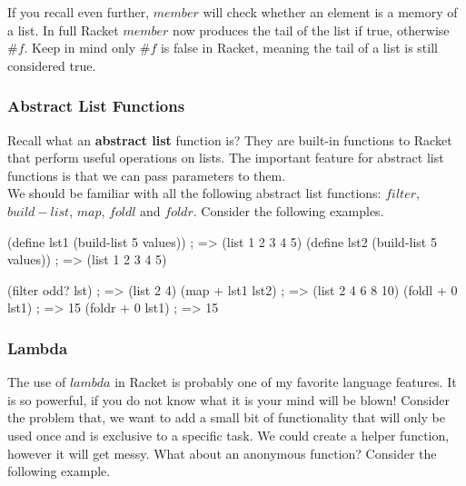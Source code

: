 If you recall even further, $member$ will check whether an element is a memory of a list. In full Racket $member$ now produces the tail of the list if true, otherwise $\#f$. Keep in mind only $\#f$ is false in Racket, meaning the tail of a list is still considered true.

\subsubsection*{Abstract List Functions}

Recall what an \textbf{abstract list} function is? They are built-in functions to Racket that perform useful operations on lists. The important feature for abstract list functions is that we can pass parameters to them.\\

We should be familiar with all the following abstract list functions: $filter$, $build-list$, $map$, $foldl$ and $foldr$. Consider the following examples.\\


\begin{code}[Lisp]
(define lst1 (build-list 5 values)) ; => (list 1 2 3 4 5)
(define lst2 (build-list 5 values)) ; => (list 1 2 3 4 5)

(filter odd? lst) ; => (list 2 4)
(map + lst1 lst2) ; => (list 2 4 6 8 10)
(foldl + 0 lst1) ; => 15
(foldr + 0 lst1) ; => 15
\end{code}

\subsubsection*{Lambda}

The use of $lambda$ in Racket is probably one of my favorite language features. It is so powerful, if you do not know what it is your mind will be blown! Consider the problem that, we want to add a small bit of functionality that will only be used once and is exclusive to a specific task. We could create a helper function, however it will get messy. What about an anonymous function? Consider the following example.\\


